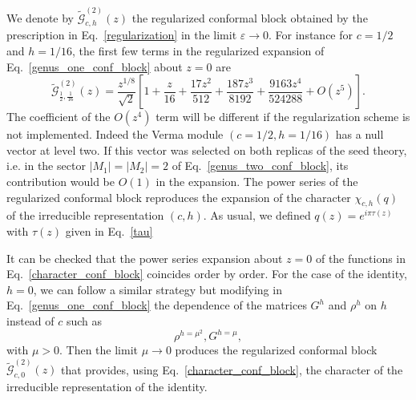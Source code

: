 \documentclass[a4paper,11pt]{article}
\begin{document}
We denote by $\tilde{\mathcal{G}}_{c, h}^{(2)}(z)$ the regularized conformal 
block obtained by the prescription in Eq.~\eqref{regularization} in the limit $\varepsilon\to 0$. 
For instance  for $c=1/2$ and $h=1/16$, the first few terms in the regularized expansion of Eq.~\eqref{genus_one_conf_block} about $z=0$ are
\begin{equation}
 \tilde{\mathcal{G}}_{\frac{1}{2},\frac{1}{16}}^{(2)}(z)=
 \frac{z^{1/8}}{\sqrt{2}}\left[1+\frac{z}{16}+\frac{17 z^2}{512}
 +\frac{187 z^3}{8192}+\frac{9163 z^4}{524288}+O(z^5)\right].
\end{equation}
The coefficient of the $O(z^4)$ term will be different if the regularization
scheme is not implemented. Indeed the Verma module $(c=1/2,h=1/16)$ has a null vector at level two. If this vector was selected on both replicas of the seed theory, i.e. in the sector $|M_1|=|M_2|=2$ of Eq.~\eqref{genus_two_conf_block}, its contribution would be $O(1)$ in the expansion.
The power series of the regularized conformal block reproduces the expansion of the character $\chi_{c,h}(q)$ of the irreducible representation $(c,h)$. As usual, we defined $q(z)=e^{i\pi \tau(z)}$ with $\tau(z)$ given in Eq.~\eqref{tau}


It can be checked that the power series expansion about $z=0$ of the functions in Eq.~\eqref{character_conf_block} coincides order by order. For the case of the identity, $h=0$, we can follow a similar strategy but 
modifying in Eq.~\eqref{genus_one_conf_block} the dependence of the matrices $G^h$ and 
$\rho^h$ on $h$ instead of $c$ such as
\begin{equation}\label{regularization_identity}
 \rho^{h=\mu^2}, G^{h=\mu},
\end{equation}
with $\mu>0$. Then the limit $\mu\to 0$ produces the regularized 
conformal block $\tilde{\mathcal{G}}_{c, 0}^{(2)}(z)$ that
provides, using Eq.~\eqref{character_conf_block}, the  character of the irreducible representation of the identity.
\end{document}
